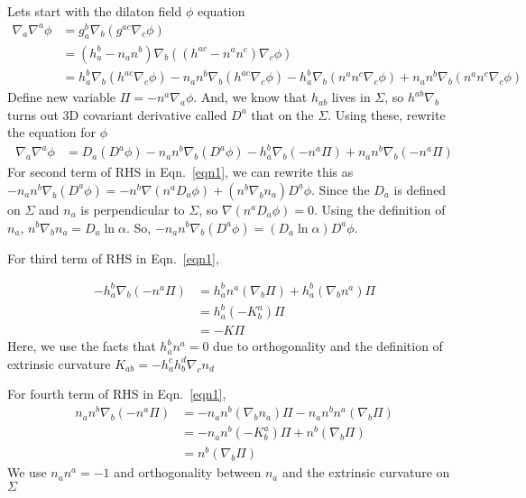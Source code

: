 \documentclass[prd]{revtex4}
\begin{document}
Let\textsc{}s start with the dilaton field $\phi$ equation
\begin{align}
\nabla_a \nabla^a \phi &= g^b_a \nabla_b (g^{ac} \nabla_c \phi) \nonumber \\
				  &= (h^b_a - n_a n^b) \nabla_b ((h^{ac}-n^a n^c) \nabla_c \phi) \nonumber \\
				  &= h^b_a \nabla_b  (h^{ac} \nabla_c \phi) - n_a n^b \nabla_b (h^{ac} \nabla_c \phi) - h^b_a \nabla_b (n^a n^c \nabla_c \phi) + n_a n^b \nabla_b (n^a n^c \nabla_c \phi)
\end{align}
Define new variable $\Pi=-n^a \nabla_a \phi$. And, we know that $h_{ab}$ lives in $\Sigma$, so $h^{ab} \nabla_b$ turns out 3D covariant derivative called $D^a$ that on the $\Sigma$. Using these, rewrite the equation for $\phi$
\begin{align}
\label{eqn1}
\nabla_a \nabla^a \phi &= D_a (D^{a} \phi) - n_a n^b \nabla_b (D^a \phi) - h^b_a \nabla_b (-n^a \Pi) + n_a n^b \nabla_b (-n^a \Pi)
\end{align}
For second term of RHS in Eqn.~\ref{eqn1}, we can rewrite this as $- n_a n^b \nabla_b (D^a \phi)=-n^b \nabla (n^a D_a \phi)+(n^b \nabla_b n_a)D^a \phi$. Since the $D_a$ is defined on $\Sigma$ and $n_a$ is perpendicular to $\Sigma$, so $\nabla (n^a D_a \phi)=0$. Using the definition of $n_a$, $n^b \nabla_b n_a = D_a \ln \alpha$. So, $- n_a n^b \nabla_b (D^a \phi)=(D_a \ln \alpha) D^a \phi$.

For third term of RHS in Eqn.~\ref{eqn1},

\begin{align}
- h^b_a \nabla_b (-n^a \Pi) &=  h^b_a n^a (\nabla_b \Pi) +  h^b_a (\nabla_b n^a) \Pi \nonumber \\
					 &= h^b_a (-K^a_b) \Pi \nonumber \\
					 &= - K \Pi 
\end{align}
Here, we use the facts that $h^b_a n^a = 0$ due to orthogonality and the definition of extrinsic curvature $K_{ab} = -h_a^c h_b^d \nabla_c n_d$

For fourth term of RHS in Eqn.~\ref{eqn1},
\begin{align}
n_a n^b \nabla_b (-n^a \Pi) &= -n_a n^b (\nabla_b n_a)\Pi - n_a n^b n^a (\nabla_b \Pi) \nonumber \\
					  &= -n_a n^b (-K^a_b)\Pi + n^b (\nabla_b \Pi) \nonumber \\
					  &= n^b (\nabla_b \Pi)
\end{align}
We use $n_a n^a=-1$ and orthogonality between $n_a$ and the extrinsic curvature on $\Sigma$
\end{document}
